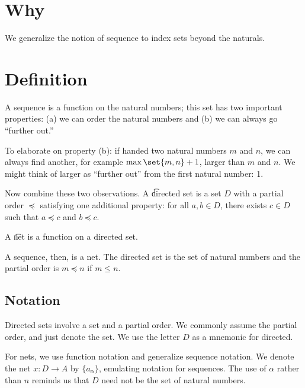 

\section*{Why}

We generalize the notion of sequence to index sets beyond the naturals.
\section*{Definition}

A sequence is a function on the natural numbers; this set has two important properties: (a) we can order the natural numbers and (b) we can always go ``further out.''

To elaborate on property (b):
if handed two natural numbers
$m$ and $n$,
we can always find another,
for example $\max\set{m,n}+1$,
larger than $m$ and $n$.
We might think of larger as
``further out'' from the
first natural number: 1.

Now combine these two observations.
A \t{directed set} is a set $D$ with a partial order $\preceq$ satisfying one additional property: for all $a, b \in D$, there exists $c \in D$ such that $a \preceq c$ and $b \preceq c$.

A \t{net} is a function on a directed set.

A sequence, then, is a net.
The directed set is the set of natural numbers and the partial order is $m \preceq n$ if $m \leq n$.

\subsection*{Notation}

Directed sets involve a set and a partial order.
We commonly assume the partial order, and just denote the set.
We use the letter $D$ as a mnemonic for directed.

For nets, we use function notation and generalize sequence notation.
We denote the net $x: D \to A$ by $\{a_{\alpha }\}$, emulating notation for sequences.
The use of $\alpha $ rather than $n$ reminds us that $D$ need not be the set of natural numbers.
